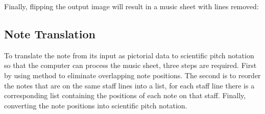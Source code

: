 \documentclass[a4paper,12pt]{report}
\begin{document}
\clearpage
Finally, flipping the output image will result in a music sheet with lines
removed:
\begin{center}
\end{center}

\clearpage

\subsection{Note Translation}
To translate the note from its input as pictorial data to scientific pitch notation so that the
computer can process the music sheet, three steps are required. First by using 
\textcite{Rosebrock} method to eliminate overlapping note positions. The second is to
reorder the notes that are on the same staff lines into a list, for each staff line
there is a corresponding list containing the positions of each note on that staff.
Finally, converting the note positions into scientific pitch notation.
\end{document}
